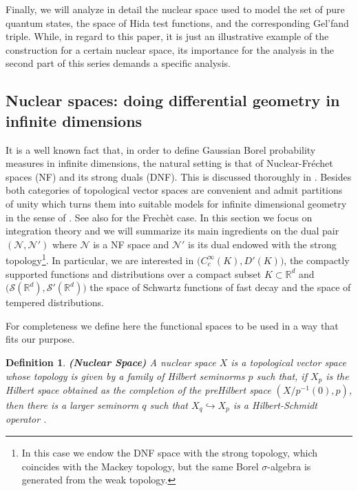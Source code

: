 \documentclass{elsarticle}%
\newtheorem{definition}{Definition}%
\begin{document}
Finally, we will analyze in detail the nuclear space used to model the set of pure quantum states, the space of Hida test functions, and the corresponding Gel'fand triple. While, in regard to this paper, it is just an illustrative example of the construction for a certain nuclear space, its importance for the analysis in the second part of this series demands a specific analysis. 


\subsection{Nuclear spaces: doing differential geometry in infinite dimensions}
It is a well known fact that, in order to define Gaussian Borel probability measures in infinite dimensions, the natural setting is that of  Nuclear-Fréchet spaces (NF) and its strong duals (DNF). This is discussed thoroughly in \cite{gelfandGeneralizedFunctions1964}.  Besides both categories of topological vector spaces are convenient and admit partitions of unity which turns them into suitable models for infinite dimensional geometry in the sense of \cite{krieglConvenientSetting1997}. See also \cite{dodsonGeometryFrechet2016} for the Frechèt case.  In this section we focus on integration theory and we will summarize its main ingredients on the dual pair  $(\mathcal{N},\mathcal{N}')$ where $\mathcal{N}$ is a NF space and $\mathcal{N}'$ is its dual endowed with the strong topology\footnote{In this case we endow the DNF space with the strong topology, which coincides with the Mackey topology, but the same Borel $\sigma$-algebra is generated from the weak topology. }. In particular, we are interested in
$\big(C^{\infty}_c(K),D'(K)\big)$, the compactly supported functions and distributions over a compact subset $K\subset \mathbb{R}^{d}$ and $\big(\mathcal{S}(\mathbb{R}^d),\mathcal{S}'(\mathbb{R}^d)\big)$ the space of Schwartz functions of fast decay and the space of tempered distributions. 
 
For completeness we define here the functional spaces to be used in a way that fits our purpose.

\begin{definition}
    \label{def:Nuclear}
    {\bf (Nuclear Space)} A nuclear space $X$ is a  topological vector space whose topology is given by a family of Hilbert seminorms $p$  such that, if $X_{p}$ is the Hilbert space obtained as  the completion of the preHilbert  space $(X/p^{-1}(0), p)$, then there is a larger seminorm $q$ such that $X_q\hookrightarrow X_p$ is a Hilbert-Schmidt operator \cite{trevesTopologicalVector1967}. 
\end{definition}
\end{document}
